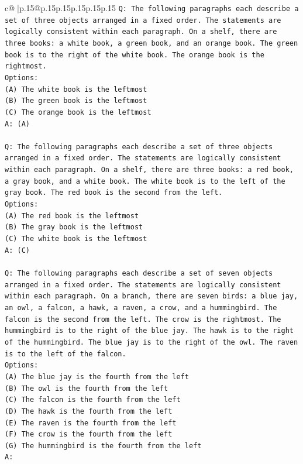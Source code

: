 \documentclass{article}
\begin{document}
{\begin{supertabular}{c@{$\;$}|p{.15\linewidth}@{}p{.15\linewidth}p{.15\linewidth}p{.15\linewidth}p{.15\linewidth}p{.15\linewidth}}
{{{\texttt{Q: The following paragraphs each describe a set of three objects arranged in a fixed order. The statements are logically consistent within each paragraph. On a shelf, there are three books: a white book, a green book, and an orange book. The green book is to the right of the white book. The orange book is the rightmost.} \\
\texttt{Options:} \\
\texttt{(A) The white book is the leftmost} \\
\texttt{(B) The green book is the leftmost} \\
\texttt{(C) The orange book is the leftmost} \\
\texttt{A: (A)} \\
\\ 
\texttt{Q: The following paragraphs each describe a set of three objects arranged in a fixed order. The statements are logically consistent within each paragraph. On a shelf, there are three books: a red book, a gray book, and a white book. The white book is to the left of the gray book. The red book is the second from the left.} \\
\texttt{Options:} \\
\texttt{(A) The red book is the leftmost} \\
\texttt{(B) The gray book is the leftmost} \\
\texttt{(C) The white book is the leftmost} \\
\texttt{A: (C)} \\
\\ 
\texttt{Q: The following paragraphs each describe a set of seven objects arranged in a fixed order. The statements are logically consistent within each paragraph. On a branch, there are seven birds: a blue jay, an owl, a falcon, a hawk, a raven, a crow, and a hummingbird. The falcon is the second from the left. The crow is the rightmost. The hummingbird is to the right of the blue jay. The hawk is to the right of the hummingbird. The blue jay is to the right of the owl. The raven is to the left of the falcon.} \\
\texttt{Options:} \\
\texttt{(A) The blue jay is the fourth from the left} \\
\texttt{(B) The owl is the fourth from the left} \\
\texttt{(C) The falcon is the fourth from the left} \\
\texttt{(D) The hawk is the fourth from the left} \\
\texttt{(E) The raven is the fourth from the left} \\
\texttt{(F) The crow is the fourth from the left} \\
\texttt{(G) The hummingbird is the fourth from the left} \\
\texttt{A:} \\
            }
        }
    }
     \\ \\


\end{supertabular}}
\end{document}
